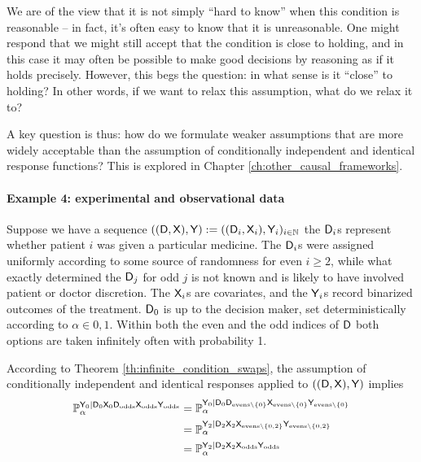 We are of the view that it is not simply ``hard to know'' when this condition is reasonable -- in fact, it's often easy to know that it is unreasonable. One might respond that we might still accept that the condition is close to holding, and in this case it may often be possible to make good decisions by reasoning as if it holds precisely. However, this begs the question: in what sense is it ``close'' to holding? In other words, if we want to relax this assumption, what do we relax it to?

A key question is thus: how do we formulate weaker assumptions that are more widely acceptable than the assumption of conditionally independent and identical response functions? This is explored in Chapter \ref{ch:other_causal_frameworks}.

\paragraph{Example 4: experimental and observational data}

Suppose we have a sequence $((\mathsf{D},\mathsf{X}),\mathsf{Y}):=((\mathsf{D}_i,\mathsf{X}_i),\mathsf{Y}_i)_{i\in \mathbb{N}}$ the $\mathsf{D}_i$s represent whether patient $i$ was given a particular medicine. The $\mathsf{D}_i$s were assigned uniformly according to some source of randomness for even $i\geq 2$, while what exactly determined the $\mathsf{D}_j$ for odd $j$ is not known and is likely to have involved patient or doctor discretion. The $\mathsf{X}_i$s are covariates, and the $\mathsf{Y}_i$s record binarized outcomes of the treatment. $\mathsf{D}_0$ is up to the decision maker, set deterministically according to $\alpha\in 0,1$. Within both the even and the odd indices of $\mathsf{D}$ both options are taken infinitely often with probability 1.

According to Theorem \ref{th:infinite_condition_swaps}, the assumption of conditionally independent and identical responses applied to $((\mathsf{D},\mathsf{X}),\mathsf{Y})$ implies
\begin{align}
    \mathbb{P}_\alpha^{\mathsf{Y}_0|\mathsf{D}_0\mathsf{X}_0\mathsf{D}_{\text{odds}}\mathsf{X}_{\text{odds}}\mathsf{Y}_{\text{odds}}}&=\mathbb{P}_\alpha^{\mathsf{Y}_0|\mathsf{D}_0\mathsf{D}_{\text{evens}\setminus\{0\}}\mathsf{X}_{\text{evens}\setminus\{0\}}\mathsf{Y}_{\text{evens}\setminus\{0\}}}\\
    &=\mathbb{P}_\alpha^{\mathsf{Y}_2|\mathsf{D}_2\mathsf{X}_2\mathsf{X}_{\text{evens}\setminus\{0,2\}}\mathsf{Y}_{\text{evens}\setminus\{0,2\}}}\\
    &=\mathbb{P}_\alpha^{\mathsf{Y}_2|\mathsf{D}_2\mathsf{X}_2\mathsf{X}_{\text{odds}}\mathsf{Y}_{\text{odds}}}
\end{align}

